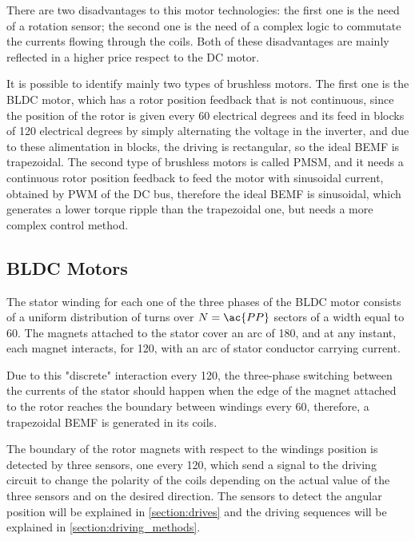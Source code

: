 There are two disadvantages to this motor technologies: the first one is the need of a rotation sensor; the second one is the need of a complex logic to commutate the currents flowing through the coils. Both of these disadvantages are mainly reflected in a higher price respect to the \ac{DC} motor.

It is possible to identify mainly two types of brushless motors. The first one is the \acf{BLDC} motor, which has a rotor position feedback that is not continuous, since the position of the rotor is given every 60 electrical degrees and its feed in blocks of 120 electrical degrees by simply alternating the voltage in the inverter, and due to these alimentation in blocks, the driving is rectangular, so the ideal \ac{BEMF} is trapezoidal. The second type of brushless motors is called \acf{PMSM}, and it needs a continuous rotor position feedback to feed the motor with sinusoidal current, obtained by \acf{PWM} of the \ac{DC} bus, therefore the ideal \ac{BEMF} is sinusoidal, which generates a lower torque ripple than the trapezoidal one, but needs a more complex control method.

\subsection{BLDC Motors}

The stator winding for each one of the three phases of the \ac{BLDC} motor consists of a uniform distribution of turns over $N=\ac{PP}$ sectors of a width equal to 60\degree. The magnets attached to the stator cover an arc of 180\degree, and at any instant, each magnet interacts, for 120\degree, with an arc of stator conductor carrying current.

Due to this "discrete" interaction every 120\degree, the three-phase switching between the currents of the stator should happen when the edge of the magnet attached to the rotor reaches the boundary between windings every 60\degree, therefore, a trapezoidal \ac{BEMF} is generated in its coils.

The boundary of the rotor magnets with respect to the windings position is detected by three sensors, one every 120\degree, which send a signal to the driving circuit to change the polarity of the coils depending on the actual value of the three sensors and on the desired direction. The sensors to detect the angular position will be explained in \ref{section:drives} and the driving sequences will be explained in \ref{section:driving_methods}.


